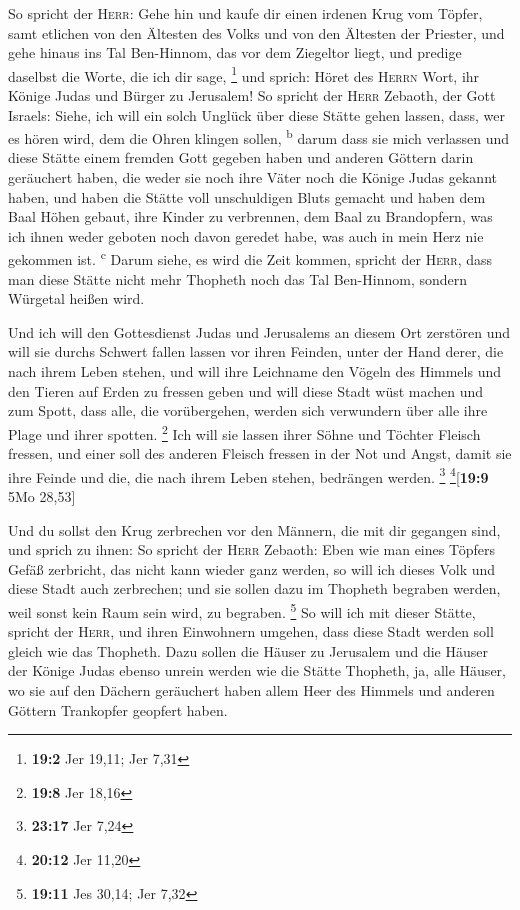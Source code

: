  So spricht der \textsc{Herr}: Gehe hin und kaufe dir
einen irdenen Krug vom Töpfer, samt etlichen von den Ältesten des Volks
und von den Ältesten der Priester,  und gehe hinaus ins
Tal Ben-Hinnom, das vor dem Ziegeltor liegt, und predige daselbst die
Worte, die ich dir sage, \footnote{\textbf{19:2} Jer 19,11; Jer 7,31}
 und sprich: Höret des \textsc{Herrn} Wort, ihr Könige
Judas und Bürger zu Jerusalem! So spricht der \textsc{Herr} Zebaoth, der
Gott Israels: Siehe, ich will ein solch Unglück über diese Stätte gehen
lassen, dass, wer es hören wird, dem die Ohren klingen sollen,
\textsuperscript{b}  darum dass sie mich verlassen und
diese Stätte einem fremden Gott gegeben haben und anderen Göttern darin
geräuchert haben, die weder sie noch ihre Väter noch die Könige Judas
gekannt haben, und haben die Stätte voll unschuldigen Bluts gemacht
 und haben dem Baal Höhen gebaut, ihre Kinder zu
verbrennen, dem Baal zu Brandopfern, was ich ihnen weder geboten noch
davon geredet habe, was auch in mein Herz nie gekommen ist.
\textsuperscript{c}  Darum siehe, es wird die Zeit kommen,
spricht der \textsc{Herr}, dass man diese Stätte nicht mehr Thopheth
noch das Tal Ben-Hinnom, sondern Würgetal heißen wird.

 Und ich will den Gottesdienst Judas und Jerusalems an
diesem Ort zerstören und will sie durchs Schwert fallen lassen vor ihren
Feinden, unter der Hand derer, die nach ihrem Leben stehen, und will
ihre Leichname den Vögeln des Himmels und den Tieren auf Erden zu
fressen geben  und will diese Stadt wüst machen und zum
Spott, dass alle, die vorübergehen, werden sich verwundern über alle
ihre Plage und ihrer spotten. \footnote{\textbf{19:8} Jer 18,16}
 Ich will sie lassen ihrer Söhne und Töchter Fleisch
fressen, und einer soll des anderen Fleisch fressen in der Not und
Angst, damit sie ihre Feinde und die, die nach ihrem Leben stehen,
bedrängen werden. \footnote{\textbf{23:17} Jer 7,24}
\footnote{\textbf{20:12} Jer 11,20}{[}\textbf{19:9} 5Mo 28,53{]}

 Und du sollst den Krug zerbrechen vor den Männern, die
mit dir gegangen sind,  und sprich zu ihnen: So spricht
der \textsc{Herr} Zebaoth: Eben wie man eines Töpfers Gefäß zerbricht,
das nicht kann wieder ganz werden, so will ich dieses Volk und diese
Stadt auch zerbrechen; und sie sollen dazu im Thopheth begraben werden,
weil sonst kein Raum sein wird, zu begraben. \footnote{\textbf{19:11}
  Jes 30,14; Jer 7,32}  So will ich mit dieser Stätte,
spricht der \textsc{Herr}, und ihren Einwohnern umgehen, dass diese
Stadt werden soll gleich wie das Thopheth.  Dazu sollen
die Häuser zu Jerusalem und die Häuser der Könige Judas ebenso unrein
werden wie die Stätte Thopheth, ja, alle Häuser, wo sie auf den Dächern
geräuchert haben allem Heer des Himmels und anderen Göttern Trankopfer
geopfert haben.


